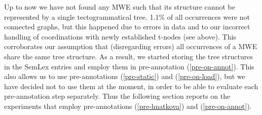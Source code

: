 \begin{itemize}
%
\end{itemize}
%
%


Up to now we have not found any MWE such that its structure cannot be represented by a single tectogrammatical tree. 1.1\% of all occurrences were not connected graphs, but this happened due to errors in data and to our incorrect handling of coordinations with newly established t-nodes (see above). This corroborates our assumption that (disregarding errors) all occurrences of a MWE share the same tree structure. As a result, we started storing the tree structures in the SemLex entries and employ them in pre-annotation (\ref{pre-on-annot}). This also allows us to use pre-annotations (\ref{pre-static}) and (\ref{pre-on-load}), but we have decided not to use them at the moment, in order to be able to evaluate each pre-annotation step separately. Thus the following section reports on the experiments that employ pre-annotations (\ref{pre-hnatkova}) and (\ref{pre-on-annot}).




